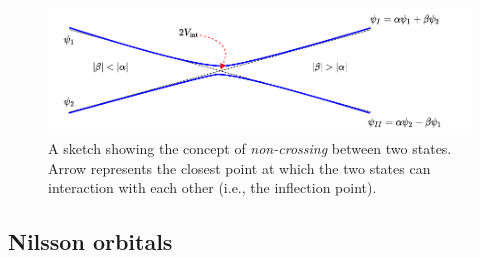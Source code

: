 \begin{figure}
    \centering
    \includegraphics[scale=0.9]{Chapters/Figures/state_non_crossing.pdf}
    \caption{A sketch showing the concept of \emph{non-crossing} between two states. Arrow represents the closest point at which the two states can interaction with each other (i.e., the inflection point).}
    \label{fig-non-crossing}
\end{figure}

\subsection*{Nilsson orbitals}

